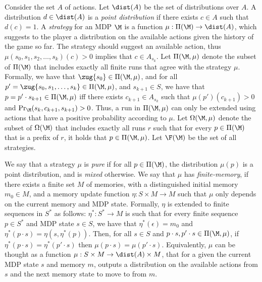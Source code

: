 \documentclass{lmcs}
\begin{document}
Consider the set $A$ of actions. Let $\dist(A)$ be the set of distributions over $A$. A distribution $d\in \dist(A)$ is a \emph{point distribution} if there exists $c\in A$ such that $d(c)=1$. A \emph{strategy} for an MDP $\M$ is a function $\mu : \Pi(\M)\rightarrow \dist(A)$, which suggests to the player a distribution on the available actions given the history of the game so far. The strategy should suggest an available action, thus $\mu(s_0,s_1,s_2,\ldots,s_k)(c)>0$ implies that $c\in A_{s_k}$. Let $\Pi(\M,\mu)$ denote the subset of $\Pi(\M)$ that includes exactly all finite runs that agree with the strategy $\mu$. Formally, we have that $\zug{s_0}\in \Pi(\M,\mu)$, and for all $p'=\zug{s_0,s_1,\ldots,s_k}\in \Pi(\M,\mu)$, and $s_{k+1}\in S$, we have that $p=p'\cdot s_{k+1}\in\Pi(\M,\mu)$ iff there exists $c_{k+1}\in A_{s_k}$ such that $\mu(p')(c_{k+1})>0$ and $\Pr_{\M}(s_{k},c_{k+1},s_{k+1})>0$. Thus, a run in $\Pi(\M,\mu)$ can only be extended using actions that have a positive probability according to $\mu$.
Let $\Omega(\M,\mu)$ denote the subset of $\Omega(\M)$ that includes exactly all runs $r$ such that for every $p\in \Pi(\M)$ that is a prefix of $r$, it holds that $p\in \Pi(\M,\mu)$. Let $\F(\M)$ be the set of all strategies.

We say that a strategy $\mu$ is \emph{pure} if for all $p \in \Pi(\M)$, the distribution $\mu(p)$ is a point distribution, and is \emph{mixed} otherwise.
We say that $\mu$ has \emph{finite-memory}, if there exists a finite set $M$ of memories, with a distinguished initial memory $m_0\in M$, and a memory update function $\eta:S\times M\to M$ such that $\mu$ only depends on the current memory and MDP state. Formally, $\eta$ is extended to finite sequences in $S^*$ as follows: $\eta^*: S^* \to M$ is such that for every finite sequence $p\in S^*$ and MDP state $s\in S$, we have that $\eta^*(\epsilon) = m_0$ and $\eta^*(p\cdot s) = \eta(s,\eta^*(p))$. 
Then, for all $s\in S$ and $p\cdot s,p'\cdot s\in \Pi(\M,\mu)$, if $\eta^*(p\cdot s)=\eta^*(p'\cdot s)$ then $\mu(p\cdot s)=\mu(p'\cdot s)$. Equivalently, $\mu$ can be thought as a function $\mu:S\times M\rightarrow \dist(A)\times M$, that for a given the current MDP state $s$ and memory $m$, outputs a distribution on the available actions from $s$ and the next memory state to move to from $m$. 
\end{document}
